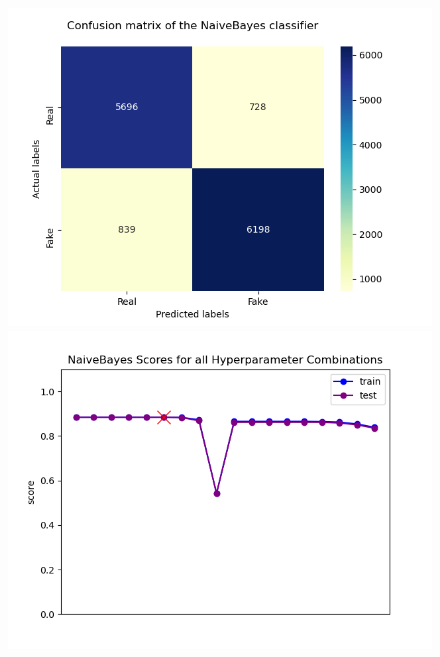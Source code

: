 \documentclass[10pt,twocolumn,letterpaper]{article}
\begin{document}
\begin{figure}[h]
   \begin{center}
        \includegraphics[width=\linewidth]{Latex_Report/report/Graphs/NB/confusion_matrix.png}
        \includegraphics[width=\linewidth]{Latex_Report/report/Graphs/NB/scores_plot.png}
   \end{center}
        \vspace*{-8mm}
        \caption{\label{first_figure}}
\end{figure}
\end{document}
